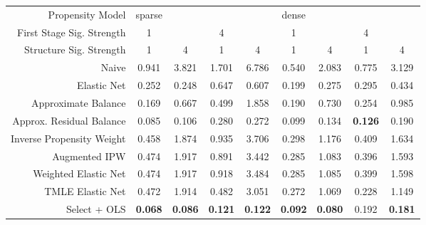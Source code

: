 \begin{table}[ht]
\centering
\begin{tabular}{|r|cc|cc|cc|cc|}
   \hline
Propensity Model & sparse &  &  &  & dense &  &  &  \\ 
  First Stage Sig. Strength & 1 &  & 4 &  & 1 &  & 4 &  \\ 
  Structure Sig. Strength & 1 & 4 & 1 & 4 & 1 & 4 & 1 & 4 \\ 
   \hline
Naive & 0.941 & 3.821 & 1.701 & 6.786 & 0.540 & 2.083 & 0.775 & 3.129 \\ 
  Elastic Net & 0.252 & 0.248 & 0.647 & 0.607 & 0.199 & 0.275 & 0.295 & 0.434 \\ 
   \hline
Approximate Balance & 0.169 & 0.667 & 0.499 & 1.858 & 0.190 & 0.730 & 0.254 & 0.985 \\ 
  Approx. Residual Balance & 0.085 & 0.106 & 0.280 & 0.272 & 0.099 & 0.134 &  \bf 0.126 & 0.190 \\ 
   \hline
Inverse Propensity Weight & 0.458 & 1.874 & 0.935 & 3.706 & 0.298 & 1.176 & 0.409 & 1.634 \\ 
  Augmented IPW & 0.474 & 1.917 & 0.891 & 3.442 & 0.285 & 1.083 & 0.396 & 1.593 \\ 
   \hline
Weighted Elastic Net & 0.474 & 1.917 & 0.918 & 3.484 & 0.285 & 1.085 & 0.399 & 1.598 \\ 
  TMLE Elastic Net & 0.472 & 1.914 & 0.482 & 3.051 & 0.272 & 1.069 & 0.228 & 1.149 \\ 
   \hline
Select + OLS &  \bf 0.068 &  \bf 0.086 &  \bf 0.121 &  \bf 0.122 &  \bf 0.092 &  \bf 0.080 & 0.192 &  \bf 0.181 \\ 
   \hline
\end{tabular}
\end{table}
